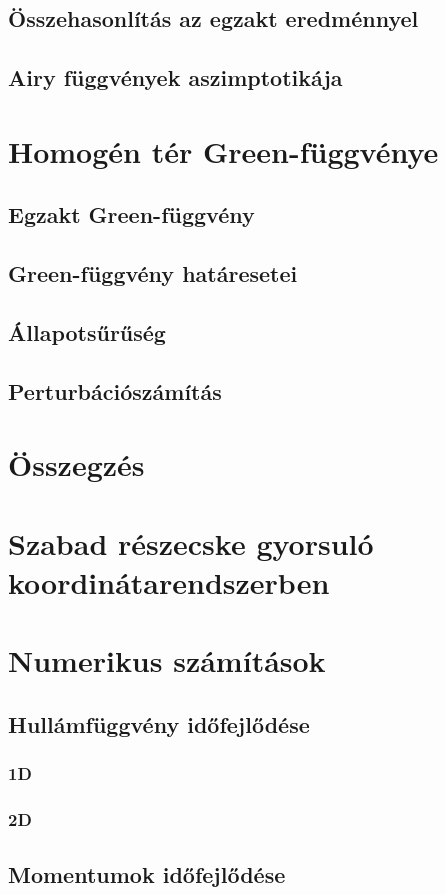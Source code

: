 \documentclass[pdftex,12pt,a4paper]{article}
\begin{document}
	\subsection{Összehasonlítás az egzakt eredménnyel}
		
	\subsection{Airy függvények aszimptotikája}
		
\section{Homogén tér Green-függvénye}
	
	\subsection{Egzakt Green-függvény}
		
	\subsection{Green-függvény határesetei}
		
	\subsection{Állapotsűrűség}
		
	\subsection{Perturbációszámítás}
		
\section{Összegzés}
	
\appendix
\section{Szabad részecske gyorsuló koordinátarendszerben}
	
\section{Numerikus számítások}
	
	\subsection{Hullámfüggvény időfejlődése}
		\subsubsection{1D}
		\subsubsection{2D}
	\subsection{Momentumok időfejlődése}
		
	
    \newpage
	
    
\end{document}
